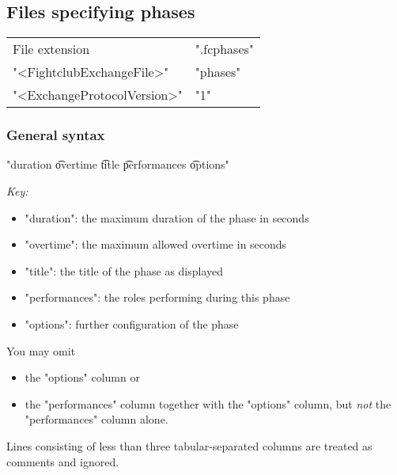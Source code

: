 \documentclass[11pt]{ltxdoc}
\begin{document}
    
    
    \subsection{Files specifying phases}
    \begin{center}
        \begin{tabular}{ll}
            File extension & ".fcphases" \\
            "<FightclubExchangeFile>" & "phases" \\
            "<ExchangeProtocolVersion>" & "1"
        \end{tabular}
    \end{center}
    
    
    \subsubsection*{General syntax}
    \begin{center}
        "duration  \t  overtime  \t  title  \t  performances  \t  options"
    \end{center}
    
    \smallskip
    \textit{Key:}
    \begin{itemize}
        \item "duration": the maximum duration of the phase in seconds
        \item "overtime": the maximum allowed overtime in seconds
        \item "title": the title of the phase as displayed
        \item "performances": the roles performing during this phase
        \item "options": further configuration of the phase
    \end{itemize}

    \smallskip
    You may omit
    \begin{itemize}
        \item
            the "options" column or
        \item
            the "performances" column together with the "options" column, but \textit{not} the "performances" column alone.
    \end{itemize}
    
    \smallskip
    Lines consisting of less than three tabular-separated columns are treated as comments and ignored.

    
\end{document}
